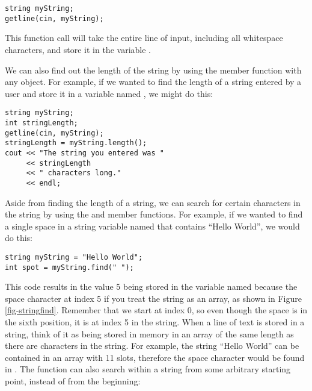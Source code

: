 \noindent\begin{minipage}{\linewidth}\begin{lstlisting}
string myString;
getline(cin, myString);
\end{lstlisting}\end{minipage}

\noindent This function call will take the entire line of input, including all whitespace characters, and store it in the variable . 
		
We can also find out the length of the string by using the member function  with any  object.
For example, if we wanted to find the length of a string entered by a user and store it in a variable named , we might do this:

\noindent\begin{minipage}{\linewidth}\begin{lstlisting}
string myString;
int stringLength;
getline(cin, myString);
stringLength = myString.length();
cout << "The string you entered was "
     << stringLength
     << " characters long."
     << endl;
\end{lstlisting}\end{minipage}

\noindent Aside from finding the length of a string, we can search for certain characters in the string by using the  and  member functions.
For example, if we wanted to find a single space in a string variable named  that contains ``Hello World'', we would do this:

\noindent\begin{minipage}{\linewidth}\begin{lstlisting}
string myString = "Hello World";
int spot = myString.find(" ");
\end{lstlisting}\end{minipage}

This code results in the value 5 being stored in the variable named  because the space character at index 5 if you treat the string as an array, as shown in Figure \ref{fig-stringfind}.
Remember that we start at index 0, so even though the space is in the sixth position, it is at index 5 in the string.
When a line of text is stored in a string, think of it as being stored in memory in an array of the same length as there are characters in the string.
For example, the string ``Hello World'' can be contained in an array with 11 slots, therefore the space character would be found in .
The  function can also search within a string from some arbitrary starting point, instead of from the beginning:

